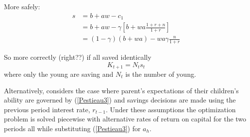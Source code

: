 \documentclass{article}
\begin{document}
More safely:
\begin{equation}
\begin{split}
s
&= b + aw - c_{1}
\\
&= b + aw - \gamma[b + wa \frac{1+r+n}{1+r}]
\\
&= (1-\gamma)(b+wa) - wa \gamma \frac{n}{1+r}
\end{split}
\end{equation}

So more correctly (right??) if all saved identically %
\begin{equation}
K_{t+1} = N_{t} s_{t}
\end{equation}
where only the young are saving and $N_{t}$ is the number of young.\newline


Alternatively, \citet{pestieau-1984-oep} considers the case where parent's expectations of their children's ability are governed by (\ref{Pestieau3}) and savings decisions are made using the previous period interest rate, $r_{t-1}$.  Under these assumptions the optimization problem is solved piecewise with alternative rates of return on capital for the two periods all while substituting (\ref{Pestieau3}) for $a_h$.
\end{document}

